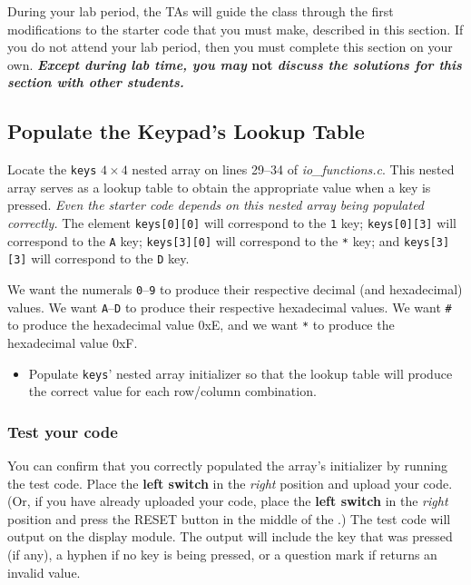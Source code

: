 During your lab period, the TAs will guide the class through the first modifications to the starter code that you must make, described in this section.
If you do not attend your lab period, then you must complete this section on your own.
\textbf{\textit{Except during lab time, you may }not\textit{ discuss the solutions for this section with other students.}}




\subsection{Populate the Keypad's Lookup Table} \label{subsec:populatekeypad}

Locate the \lstinline{keys} $4 \times 4$ nested array on lines 29--34 of \textit{io\_functions.c}.
This nested array serves as a lookup table to obtain the appropriate value when a key is pressed.
\textit{Even the starter code depends on this nested array being populated correctly.}
The element \lstinline{keys[0][0]} will correspond to the \texttt{1} key;
\lstinline{keys[0][3]} will correspond to the \texttt{A} key;
\lstinline{keys[3][0]} will correspond to the \texttt{*} key;
and \lstinline{keys[3][3]} will correspond to the \texttt{D} key.

We want the numerals \texttt{0}--\texttt{9} to produce their respective decimal (and hexadecimal) values.
We want \texttt{A}--\texttt{D} to produce their respective hexadecimal values.
We want \texttt{\#} to produce the hexadecimal value 0xE, and we want \texttt{*} to produce the hexadecimal value 0xF\@.

\begin{itemize}
    \item Populate \lstinline{keys}' nested array initializer so that the lookup table will produce the correct value for each row/column combination.
\end{itemize}

\subsubsection*{Test your code}

You can confirm that you correctly populated the array's initializer by running the test code.
Place the \textbf{left switch} in the \textit{right} position and upload your code.
(Or, if you have already uploaded your code, place the \textbf{left switch} in the \textit{right} position and press the RESET button in the middle of the \developmentboard.)
The test code will output on the display module.
The output will include the key that was pressed (if any), a hyphen if no key is being pressed, or a question mark if  returns an invalid value.

